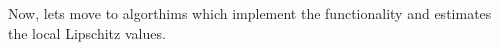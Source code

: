 \documentclass[english]{tktltiki2}
\theoremstyle{definition}
\newtheorem{definition}[thm]{Definition}
\theoremstyle{remark}
\begin{document}
Now, lets move to algorthims which implement the functionality and estimates the local Lipschitz values.



\end{document}
